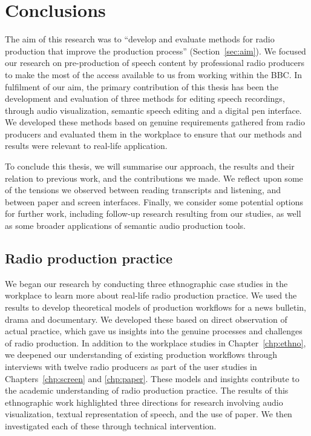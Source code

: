 \chapter{Conclusions}\label{chp:conclusions}

The aim of this research was to ``develop and evaluate methods for radio production that improve the production
process'' (Section~\ref{sec:aim}).  We focused our research on pre-production of speech content by professional radio
producers to make the most of the access available to us from working within the BBC.  In fulfilment of our aim, the
primary contribution of this thesis has been the development and evaluation of three methods for editing speech
recordings, through audio visualization, semantic speech editing and a digital pen interface.  We developed these
methods based on genuine requirements gathered from radio producers and evaluated them in the workplace to
ensure that our methods and results were relevant to real-life application.

To conclude this thesis, we will summarise our approach, the results and their relation to previous
work, and the contributions we made.  We reflect upon some of the tensions we observed between reading
transcripts and listening, and between paper and screen interfaces.  Finally, we consider some potential options for
further work, including follow-up research resulting from our studies, as well as some broader applications
of semantic audio production tools.

\section{Radio production practice}

We began our research by conducting three ethnographic case studies in the workplace to learn more about real-life
radio production practice.  We used the results to develop theoretical models of production workflows for a news
bulletin, drama and documentary.  We developed these based on direct observation of actual practice, which gave us 
insights into the genuine processes and challenges of radio production.  In addition to the workplace studies in
Chapter~\ref{chp:ethno}, we deepened our understanding of existing production workflows through interviews with twelve
radio producers as part of the user studies in Chapters~\ref{chp:screen} and \ref{chp:paper}.  These models and
insights contribute to the academic understanding of radio production practice.  The results of this ethnographic work
highlighted three directions for research involving audio visualization, textual representation of speech, and the use
of paper.  We then investigated each of these through technical intervention.

